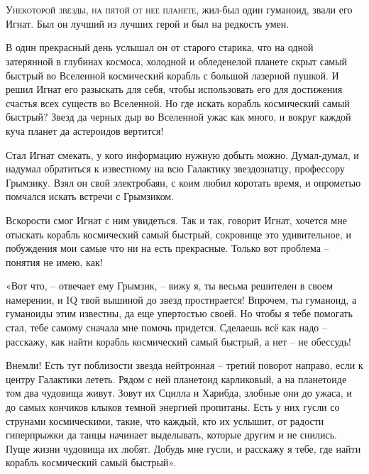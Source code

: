 \documentclass[ebook,oneside,final,openright]{memoir}
\begin{document}
\chapter{}
 \lettrine{У}{некоторой звезды, на пятой от нее планете,} жил-был один гуманоид, звали его Игнат. Был он лучший из лучших герой и был на редкость умен.\par
\par
В один прекрасный день услышал он от старого старика, что на одной затерянной в глубинах космоса, холодной и обледенелой планете скрыт самый быстрый во Вселенной космический корабль с большой лазерной пушкой. И решил Игнат его разыскать для себя, чтобы использовать его для достижения счастья всех существ во Вселенной. Но где искать корабль космический самый быстрый? Звезд да черных дыр во Вселенной ужас как много, и вокруг каждой куча планет да астероидов вертится!\par
\par
Стал Игнат смекать, у кого информацию нужную добыть можно. Думал-думал, и надумал обратиться к известному на всю Галактику звездознатцу, профессору Грымзику. Взял он свой электробаян, с коим любил коротать время, и опрометью помчался искать встречи с Грымзиком.\par
\par
Вскорости смог Игнат с ним увидеться. Так и так, говорит Игнат, хочется мне отыскать корабль космический самый быстрый, сокровище это удивительное, и побуждения мои самые что ни на есть прекрасные. Только вот проблема – понятия не имею, как!\par
\par
«Вот что, – отвечает ему Грымзик, – вижу я, ты весьма решителен в своем намерении, и IQ твой вышиной до звезд простирается! Впрочем, ты гуманоид, а гуманоиды этим известны, да еще упертостью своей. Но чтобы я тебе помогать стал, тебе самому сначала мне помочь придется. Сделаешь всё как надо – расскажу, как найти корабль космический самый быстрый, а нет – не обессудь!\par
\par
Внемли! Есть тут поблизости звезда нейтронная – третий поворот направо, если к центру Галактики лететь. Рядом с ней планетоид карликовый, а на планетоиде том два чудовища живут. Зовут их Сцилла и Харибда, злобные они до ужаса, и до самых кончиков клыков темной энергией пропитаны. Есть у них гусли со струнами космическими, такие, что каждый, кто их услышит, от радости гиперпрыжки да танцы начинает выделывать, которые другим и не снились. Пуще жизни чудовища их любят. Добудь мне гусли, и расскажу я тебе, где найти корабль космический самый быстрый».\par
\end{document}
